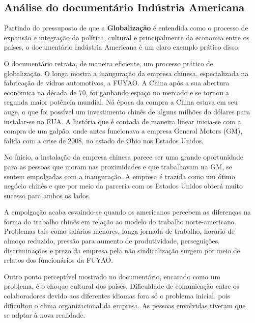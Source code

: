 \documentclass[12pt,a4paper,oneside]{article}
\begin{document}
\begin{onehalfspace}
\newpage
\section{Análise do documentário Indústria Americana}

\hspace{1.5cm} Partindo do pressuposto de que a \textbf{Globalização} é entendida como o processo de expansão e integração da política, cultural e principalmente da economia entre os países, o documentário Indústria Americana é um claro exemplo prático disso.

O documentário retrata, de maneira eficiente, um processo prático de globalização. O longa mostra a inauguração da empresa chinesa, especializada na fabricação de vidros automotivos, a FUYAO. A China após a sua abertura econômica na década de 70, foi ganhando espaço no mercado e se tornou a segunda maior potência mundial. Ná época da compra a China estava em seu auge, o que foi possível um investimento chinês de alguns milhões do dólares para instalar-se no EUA.
A história que é contada de maneira linear inicia-se com a compra de um galpão, onde antes funcionava a empresa General Motors (GM), falida com a crise de 2008, no estado de Ohio nos Estados Unidos.

No ínicio, a instalação da empresa chinesa parece ser uma grande oportunidade para as pessoas que moram nas proximidades e que trabalhavam na GM, se sentem empolgadas com a inauguração. A empresa é trazida como um ótimo negócio chinês e que por meio da parceria com os Estados Unidos obterá muito sucesso para ambos os lados.

A empolgação acaba esvaindo-se quando os americanos percebem as diferenças na forma do trabalho chinês em relação ao modelo do trabalho norte-americano. Problemas tais como salários menores, longa jornada de trabalho, horário de almoço reduzido, pressão para aumento de produtividade, perseguições, discriminações e prezo da empresa pela não sindicalização surgem por meio de relatos dos funcionários da FUYAO.

Outro ponto perceptível mostrado no documentário, encarado como um problema, é o choque cultural dos países. Dificuldade de comunicação entre os colaboradores devido aos diferentes idiomas fora só o problema inicial, pois dificultou o clima organizacional da empresa. As pessoas envolvidas tiveram que se adptar à nova realidade.


\end{onehalfspace}
\end{document}
